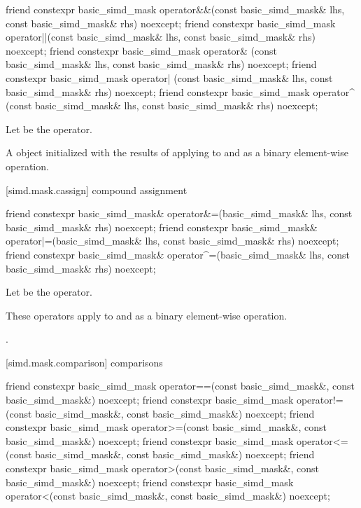 \begin{itemdecl}
friend constexpr basic_simd_mask
  operator&&(const basic_simd_mask& lhs, const basic_simd_mask& rhs) noexcept;
friend constexpr basic_simd_mask
  operator||(const basic_simd_mask& lhs, const basic_simd_mask& rhs) noexcept;
friend constexpr basic_simd_mask
  operator& (const basic_simd_mask& lhs, const basic_simd_mask& rhs) noexcept;
friend constexpr basic_simd_mask
  operator| (const basic_simd_mask& lhs, const basic_simd_mask& rhs) noexcept;
friend constexpr basic_simd_mask
  operator^ (const basic_simd_mask& lhs, const basic_simd_mask& rhs) noexcept;
\end{itemdecl}

\begin{itemdescr}
  \pnum Let \op{} be the operator.

  \pnum\returns
  A  object initialized with the results of applying \op{}
  to  and  as a binary element-wise operation.
\end{itemdescr}

[simd.mask.cassign]{ compound assignment}

\begin{itemdecl}
friend constexpr basic_simd_mask&
  operator&=(basic_simd_mask& lhs, const basic_simd_mask& rhs) noexcept;
friend constexpr basic_simd_mask&
  operator|=(basic_simd_mask& lhs, const basic_simd_mask& rhs) noexcept;
friend constexpr basic_simd_mask&
  operator^=(basic_simd_mask& lhs, const basic_simd_mask& rhs) noexcept;
\end{itemdecl}

\begin{itemdescr}
  \pnum Let \op{} be the operator.

  \pnum\effects
  These operators apply \op{} to  and  as a binary
  element-wise operation.

  \pnum\returns
  .
\end{itemdescr}

[simd.mask.comparison]{ comparisons}

\begin{itemdecl}
friend constexpr basic_simd_mask
  operator==(const basic_simd_mask&, const basic_simd_mask&) noexcept;
friend constexpr basic_simd_mask
  operator!=(const basic_simd_mask&, const basic_simd_mask&) noexcept;
friend constexpr basic_simd_mask
  operator>=(const basic_simd_mask&, const basic_simd_mask&) noexcept;
friend constexpr basic_simd_mask
  operator<=(const basic_simd_mask&, const basic_simd_mask&) noexcept;
friend constexpr basic_simd_mask
  operator>(const basic_simd_mask&, const basic_simd_mask&) noexcept;
friend constexpr basic_simd_mask
  operator<(const basic_simd_mask&, const basic_simd_mask&) noexcept;
\end{itemdecl}

